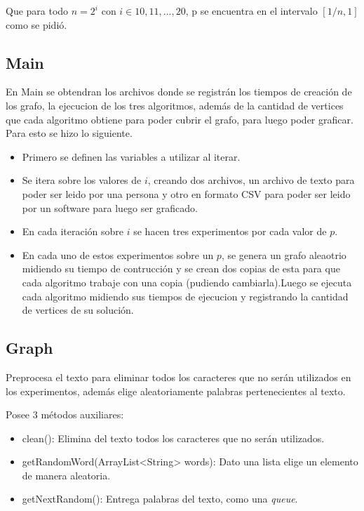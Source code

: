 \documentclass[letterpaper,10pt]{article}
\begin{document}
	
	Que para todo $n = 2^i$ con $i\in{10,11,...,20}$, p se encuentra en el intervalo $[1/n,1]$ como se pidió.

	
	
	\subsection{Main}
	
	En Main se obtendran los archivos donde se registrán los tiempos de creación de los grafo, la ejecucion de los tres algoritmos, además de la cantidad de vertices que cada algoritmo obtiene para poder cubrir el grafo, para luego poder graficar. Para esto se hizo lo siguiente.
	\begin{itemize}
		\item Primero se definen las variables a utilizar al iterar.
		\item Se itera sobre los valores de $i$, creando dos archivos, un archivo de texto para poder ser leido por una persona y otro en formato CSV para poder ser leido por un software para luego ser graficado. 
		\item En cada iteración sobre $i$ se hacen tres experimentos por cada valor de $p$.
		\item En cada uno de estos experimentos sobre un $p$, se genera un grafo aleaotrio midiendo su tiempo de contrucción y se crean dos copias de esta para que cada algoritmo trabaje con una copia (pudiendo cambiarla).Luego se ejecuta cada algoritmo midiendo sus tiempos de ejecucion y registrando la cantidad de vertices de su solución.
		
	\end{itemize}

	\subsection{Graph}

	Preprocesa el texto para eliminar todos los caracteres que no serán utilizados en los experimentos, además elige aleatoriamente palabras pertenecientes al texto.

	Posee 3 métodos auxiliares:
	\begin{itemize}
		\item clean(): Elimina del texto todos los caracteres que no serán utilizados.
		\item getRandomWord(ArrayList<String> words): Dato una lista elige un elemento de manera aleatoria.
		\item getNextRandom(): Entrega palabras del texto, como una \textit{queue}. 
	\end{itemize}
\end{document}
